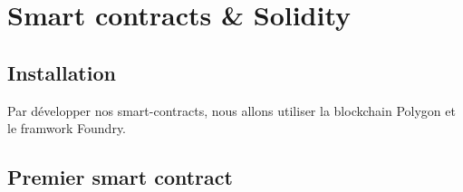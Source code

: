 \section{Smart contracts \& Solidity}
\subsection{Installation}

Par développer nos smart-contracts, nous allons utiliser la blockchain Polygon et le framwork Foundry.

\subsection{Premier smart contract}

\inputminted{solidity}{code/0000_contract.sol}